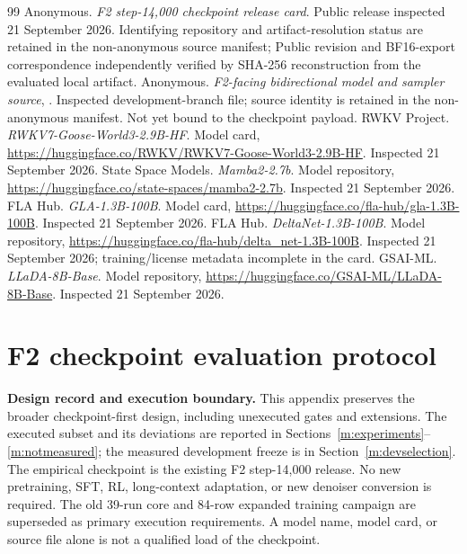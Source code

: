 \documentclass{article}
\theoremstyle{remark}\newtheorem{remark}[theorem]{Remark}
\begin{document}
\begin{thebibliography}{99}
 Anonymous. \emph{F2 step-14,000 checkpoint release card}. Public release inspected 21 September 2026. Identifying repository and artifact-resolution status are retained in the non-anonymous source manifest; Public revision and BF16-export correspondence independently verified by SHA-256 reconstruction from the evaluated local artifact.
 Anonymous. \emph{F2-facing bidirectional model and sampler source}, . Inspected development-branch file; source identity is retained in the non-anonymous manifest. Not yet bound to the checkpoint payload.
 RWKV Project. \emph{RWKV7-Goose-World3-2.9B-HF}. Model card, \url{https://huggingface.co/RWKV/RWKV7-Goose-World3-2.9B-HF}. Inspected 21 September 2026.
 State Space Models. \emph{Mamba2-2.7b}. Model repository, \url{https://huggingface.co/state-spaces/mamba2-2.7b}. Inspected 21 September 2026.
 FLA Hub. \emph{GLA-1.3B-100B}. Model card, \url{https://huggingface.co/fla-hub/gla-1.3B-100B}. Inspected 21 September 2026.
 FLA Hub. \emph{DeltaNet-1.3B-100B}. Model repository, \url{https://huggingface.co/fla-hub/delta_net-1.3B-100B}. Inspected 21 September 2026; training/license metadata incomplete in the card.
 GSAI-ML. \emph{LLaDA-8B-Base}. Model repository, \url{https://huggingface.co/GSAI-ML/LLaDA-8B-Base}. Inspected 21 September 2026.
\end{thebibliography}

\clearpage
\appendix




\section{F2 checkpoint evaluation protocol}
\label{app:protocol}
\textbf{Design record and execution boundary.} This appendix preserves the broader checkpoint-first design, including unexecuted gates and extensions. The executed subset and its deviations are reported in Sections~\ref{m:experiments}--\ref{m:notmeasured}; the measured development freeze is in Section~\ref{m:devselection}. The empirical checkpoint is the existing F2 step-14,000 release. No new pretraining, SFT, RL, long-context adaptation, or new denoiser conversion is required. The old 39-run core and 84-row expanded training campaign are superseded as primary execution requirements. A model name, model card, or source file alone is not a qualified load of the checkpoint.
\end{document}
